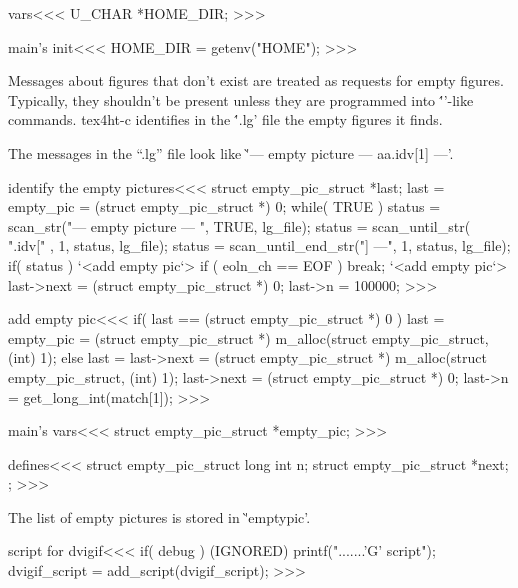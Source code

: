 {\<vars\><<<
U_CHAR *HOME_DIR;
>>>

\<main's init\><<<
HOME_DIR = getenv("HOME");
>>>






Messages about figures that don't exist are treated as requests for
empty figures. Typically, they shouldn't be present unless they are
programmed into \''\setbox'-like commands. tex4ht-c identifies in the
\''.lg' file the empty figures it finds.

The messages in the ``.lg'' file look like
\`'--- empty picture --- aa.idv[1] ---'.



\<identify the empty pictures\><<<
{                             struct empty_pic_struct *last;    
   last = empty_pic = (struct empty_pic_struct *) 0;
   while( TRUE ) {              
      status = scan_str("--- empty picture --- ", TRUE, lg_file);
      status = scan_until_str( ".idv[" , 1, status, lg_file);
      status = scan_until_end_str("] ---", 1, status, lg_file);
      if( status ){ `<add empty pic`> } 
      if ( eoln_ch == EOF ){ break; }      
   }
   `<add empty pic`>
   last->next = (struct empty_pic_struct *) 0;
   last->n = 100000;    
}
>>>


\<add empty pic\><<<
if( last == (struct empty_pic_struct *) 0 ){
   last = empty_pic = (struct empty_pic_struct *) 
                   m_alloc(struct empty_pic_struct, (int) 1);   
} else { 
   last = last->next = (struct empty_pic_struct *) 
                   m_alloc(struct empty_pic_struct, (int) 1);   
}
last->next = (struct empty_pic_struct *) 0;
last->n = get_long_int(match[1]);    
>>>


\<main's vars\><<<
struct empty_pic_struct *empty_pic;    
>>>
  
\<defines\><<<
struct empty_pic_struct{
  long int n;
  struct empty_pic_struct *next;
};
>>>



The list of empty pictures is stored in \`'emptypic'.





\<script for dvigif\><<<
if( debug ){ (IGNORED) printf(".......'G' script\n"); }
dvigif_script = add_script(dvigif_script);
>>>


}
